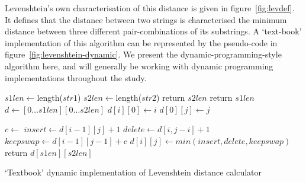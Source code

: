 Levenshtein's own characterisation of this distance is given in
figure~\ref{fig:levdef}. It defines that the distance between two
strings is characterised the minimum distance between three different
pair-combinations of its substrings. A `text-book' implementation of
this algorithm can be represented by the pseudo-code in
figure~\ref{fig:levenshtein-dynamic}. We present the
dynamic-programming-style algorithm here, and will generally be
working with dynamic programming implementations throughout the study.


    
    

\begin{algorithm}
  \begin{algorithmic}
    \State $s1len \gets $length($str1$)
    \State $s2len \gets $length($str2$)    
    \State return $s2len$
    \EndIf
    \State return $s1len$
    \EndIf
    \State $d \gets [0 \dots s1len][0 \dots s2len]$ 
    \State $d[i][0] \gets i$
    \EndFor
    \State $d[0][j] \gets j$
    \EndFor

    \State $c \gets $
    \State $insert \gets d[i-1][j] + 1$
    \State $delete \gets d[i,j-i] + 1$
    \State $keepswap \gets d[i-1][j-1] + c$
    \State $d[i][j] \gets min(insert, delete, keepswap)$
    \EndFor
    \EndFor
    \State return $d[s1en][s2len]$
    \EndFunction
  \end{algorithmic}
  \caption{`Textbook' dynamic implementation of Levenshtein distance calculator}
  \label{fig:levenshtein-dynamic}
\end{algorithm}


